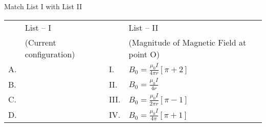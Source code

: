 \item Match List I with List II

\def\OptionA{
    \begin{center}
        \begin{tikzpicture}
            \draw[thick, red, ->] (0,0) -- (2,0); 
            \draw[thick, blue] (2,0) arc(0:180:1);
            \draw[thick, red, ->] (4,-0.5) -- (4,0.5);
            \node at (2, 0.25) {O};
        \end{tikzpicture}
    \end{center}
}
            
\def\OptionB{
    \begin{center}
        \begin{tikzpicture}
            \draw[thick, red] (0,0) arc(90:-90:0.5);
            \draw[thick, blue, ->] (1,0) -- (2,0);
            \draw[thick, blue] (2,0) -- (4,0);
            \node at (1, 0.75) {O};
        \end{tikzpicture}
    \end{center}
}

\def\OptionC{
    \begin{center}
        \begin{tikzpicture}
            \draw[thick, red, ->] (0,0) -- (0,1);
            \draw[thick, blue] (0,1) arc(90:270:0.5);
            \draw[thick, blue, ->] (0.5,1) -- (4,1);
            \node at (1, 0.75) {O};
            \node at (0, 1.25) {$\ell$};
        \end{tikzpicture}
    \end{center}
}

\def\OptionD{
    \begin{center}
        \begin{tikzpicture}
            \draw[thick, red, ->] (0,0) -- (4,0);
            \draw[thick, blue] (0,0) arc(0:360:0.5);
            \node at (1.5, 0.5) {O};
        \end{tikzpicture}
    \end{center}
}

\begin{center}
    \renewcommand{\arraystretch}{2}
    \begin{table}[h]
        \centering
        \begin{tabular}{p{0.25cm}p{8cm}|p{0.25cm}p{5cm}}
        \hline
        & List – I & & List – II \\
        & (Current configuration) & & (Magnitude of Magnetic Field at point O)\\
        \hline
        A.& \OptionA & I.& $B_0 = \frac{\mu_0 I}{4\pi r}[\pi + 2]$\\
        \hline
        B.& \OptionB & II.& $B_0 = \frac{\mu_0 I}{4 r}$\\
        \hline
        C.& \OptionC & III.& $B_0 = \frac{\mu_0 I}{2\pi r}[\pi - 1]$\\
        \hline
        D.& \OptionD & IV.& $B_0 = \frac{\mu_0 I}{4\pi}[\pi + 1]$\\
        \hline
        \end{tabular}
    \end{table}
\end{center}

